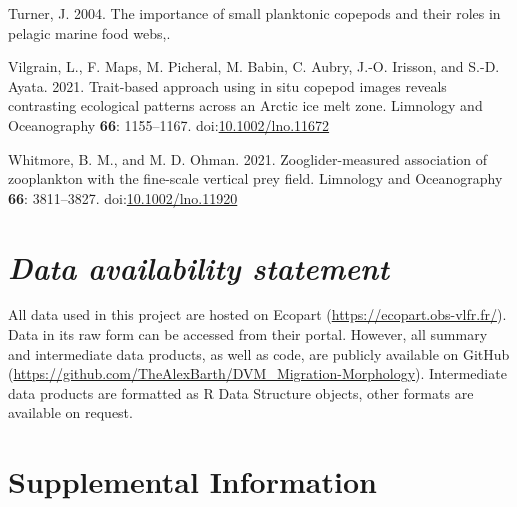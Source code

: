 \documentclass[
]{article}
\newlength{\cslhangindent}
\newlength{\cslentryspacingunit} %
\newenvironment{CSLReferences}[2] %
 {%
  \setlength{\parindent}{0pt}
  \ifodd #1
  \let\oldpar\par
  \def\par{\hangindent=\cslhangindent\oldpar}
  \fi
  \setlength{\parskip}{#2\cslentryspacingunit}
 }%
 {}
\begin{document}
\begin{CSLReferences}{1}{0}
\leavevmode{}%
Turner, J. 2004. The importance of small planktonic copepods and their
roles in pelagic marine food webs,.

\leavevmode{}%
Vilgrain, L., F. Maps, M. Picheral, M. Babin, C. Aubry, J.-O. Irisson,
and S.-D. Ayata. 2021. Trait-based approach using in situ copepod images
reveals contrasting ecological patterns across an Arctic ice melt zone.
Limnology and Oceanography \textbf{66}: 1155--1167.
doi:\href{https://doi.org/10.1002/lno.11672}{10.1002/lno.11672}

\leavevmode{}%
Whitmore, B. M., and M. D. Ohman. 2021. Zooglider-measured association
of zooplankton with the fine-scale vertical prey field. Limnology and
Oceanography \textbf{66}: 3811--3827.
doi:\href{https://doi.org/10.1002/lno.11920}{10.1002/lno.11920}

\end{CSLReferences}

\hypertarget{data-availability-statement}{%
\section{\texorpdfstring{\emph{Data availability
statement}}{Data availability statement}}\label{data-availability-statement}}

All data used in this project are hosted on Ecopart
(\url{https://ecopart.obs-vlfr.fr/}). Data in its raw form can be
accessed from their portal. However, all summary and intermediate data
products, as well as code, are publicly available on GitHub
(\url{https://github.com/TheAlexBarth/DVM_Migration-Morphology}).
Intermediate data products are formatted as R Data Structure objects,
other formats are available on request.

\hypertarget{supplemental-information}{%
\section{Supplemental Information}\label{supplemental-information}}
\end{document}
